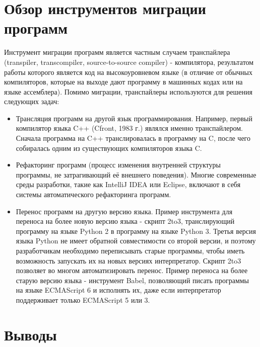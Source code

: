 \section{Обзор инструментов миграции программ}
Инструмент миграции программ является частным случаем транспайлера (transpiler, transcompiler, source-to-source compiler) - компилятора, результатом работы которого является код на высокоуровневом языке (в отличие от обычных компиляторов, которые на выходе дают программу в машинных кодах или на языке ассемблера). Помимо миграции, транспайлеры используются для решения следующих задач:

\begin{itemize}
\item Трансляция программ на другой язык программирования. Например, первый компилятор языка C++ (Cfront, 1983 г.) являлся именно транспайлером. Сначала программа на C++ транслировалась в программу на C, после чего собиралась одним из существующих компиляторов языка C.
\item Рефакторинг программ (процесс изменения внутренней структуры программы, не затрагивающий её внешнего поведения). Многие современные среды разработки, такие как IntelliJ IDEA или Eclipse, включают в себя системы автоматического рефакторинга программ.
\item Перенос программ на другую версию языка. Пример инструмента для переноса на более новую версию языка - скрипт 2to3, транслирующий программу на языке Python 2 в программу на языке Python 3. Третья версия языка Python не имеет обратной совместимости со второй версии, и поэтому разработчикам необходимо переписывать старые программы, чтобы иметь возможность запускать их на новых версиях интерпретатор. Скрипт 2to3 позволяет во многом автоматизировать перенос. Пример переноса на более старую версию языка - инструмент Babel, позволяющий писать программы на языке ECMAScript 6 и исполнять их, даже если интерпретатор поддерживает только ECMAScript 5 или 3.
\end{itemize}

\section{Выводы}